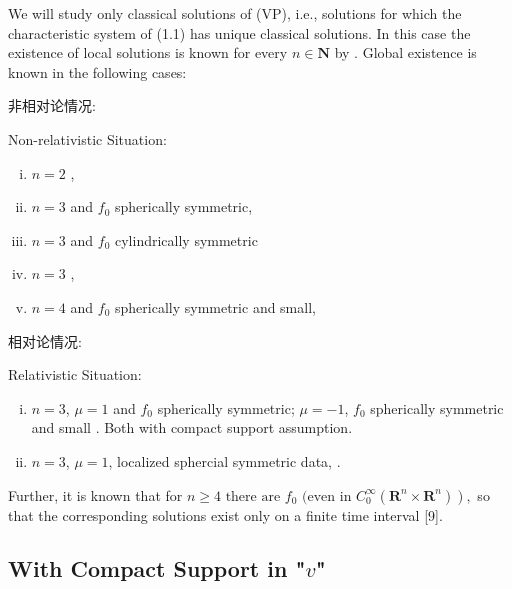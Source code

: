 
We will study only classical solutions of (VP), i.e., solutions for which the characteristic system of (1.1) has unique classical solutions. In this case the existence of local solutions is known for every $n \in \mathbf{N}$ by \cite{HorstClasssicalI}.  Global existence is known in the following cases:

非相对论情况:

Non-relativistic Situation:
\begin{enumerate}[(i)]
    \item $n=2$ , \cite{Illner1979}
    \item $n=3$ and $f_0$ spherically symmetric, \cite{HorstClasssicalII}
    \item $n=3$ and $f_0$ cylindrically symmetric \cite{hellwig1964partial}
    \item $n=3$ , \cite{1991InMat.105..415L}
    \item $n=4$ and $f_0$ spherically symmetric and small, \cite{hellwig1964partial}
\end{enumerate}



相对论情况:

Relativistic Situation:
\begin{enumerate}[(i)]
    \item $n=3$, $\mu=1$ and $f_0$ spherically symmetric; $\mu=-1$, $f_0$ spherically symmetric and small \cite{glassey_symmetric_1985}. Both with compact support assumption.
    \item $n=3$, $\mu=1$, localized sphercial symmetric data, \cite{wang2003global}. 
\end{enumerate}


Further, it is known that for $\left.n \geqslant 4 \text { there are } f_0 \text { (even in } C_{0}^{\infty}\left(\mathbf{R}^{n} \times \mathbf{R}^{n}\right)\right),$ so that the corresponding solutions exist only on a finite time interval [9].

\subsection{With Compact Support in "$v$"}

